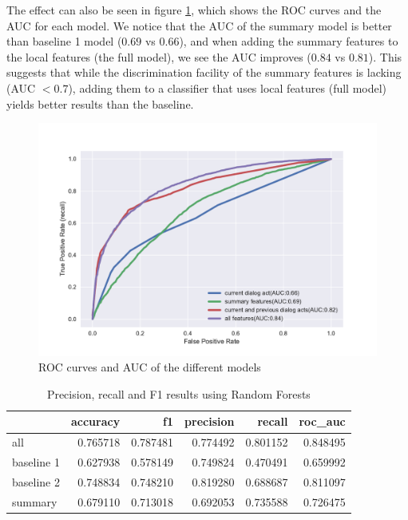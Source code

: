 The effect can also be seen in figure \ref{auc}, which shows the ROC curves and the AUC for each
model. We notice that the AUC of the summary model is better than baseline 1 model ($0.69$ vs $0.66$), and when adding the summary features to the local features (the full model), we see the AUC improves ($0.84$ vs $0.81$). This suggests that while the discrimination facility of the summary features is lacking (AUC $<0.7$), adding them to a classifier that uses local features (full model) yields better results than the baseline.
%
 \begin{figure}[ht!]
 \centering
 \includegraphics[width=\textwidth]{../scikitlearn/figures/roc.pdf}\vspace{-1.5em}
 \caption{ROC curves and AUC of the different models \label{overflow}}
\label{auc}
 \end{figure}


\begin{table}[ht!]
\begin{center}
\begin{tabular}{lrrrrr}
\toprule
{} &  accuracy &        f1 &  precision &    recall &   roc\_auc \\
\midrule
all        &  0.765718 &  0.787481 &   0.774492 &  0.801152 &  0.848495 \\
baseline 1 &  0.627938 &  0.578149 &   0.749824 &  0.470491 &  0.659992 \\
baseline 2 &  0.748834 &  0.748210 &   0.819280 &  0.688687 &  0.811097 \\
summary    &  0.679110 &  0.713018 &   0.692053 &  0.735588 &  0.726475 \\
\bottomrule
\end{tabular}
\end{center}
\caption{Precision, recall and F1 results using Random Forests }
\label{table:result}
\end{table}


